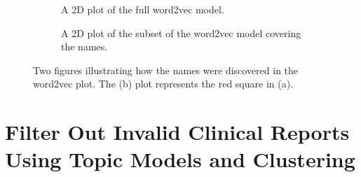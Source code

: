 \begin{figure}
    \begin{subfigure}[b]{\textwidth}
        \centering
        \caption{A 2D plot of the full word2vec model.}
    \end{subfigure}
    \quad
    \begin{subfigure}[b]{\textwidth}
        \centering
        \caption{A 2D plot of the subset of the word2vec model covering the names.}
    \end{subfigure}
    \caption{Two figures illustrating how the names were discovered in the word2vec plot. The (b) plot represents the red square in (a).}
    \label{fig:word2vec-names-overview}
\end{figure}

\section{Filter Out Invalid Clinical Reports Using Topic Models and Clustering}\label{sec:exp1-result}

